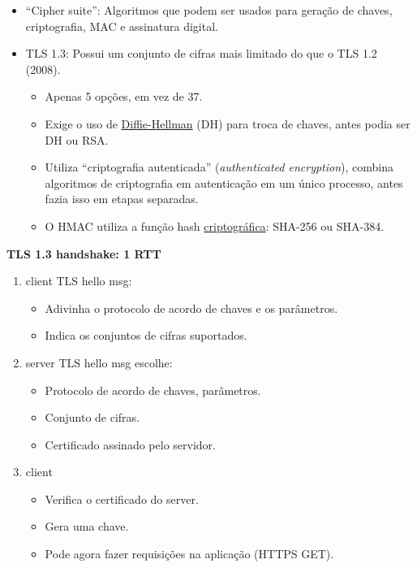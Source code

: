     \begin{itemize}[left=0.5cm, align=left, nosep]
        \item ``Cipher suite'': Algoritmos que podem ser usados para geração de chaves, criptografia, MAC e assinatura digital.
        \item TLS 1.3: Possui um conjunto de cifras mais limitado do que o TLS 1.2 (2008).
        \begin{itemize}[left=0.5cm, nosep, label=$\hookrightarrow$]
            \item Apenas 5 opções, em vez de 37.
            \item Exige o uso de \underline{Diffie-Hellman} (DH) para troca de chaves, antes podia ser DH ou RSA.
            \item Utiliza ``criptografia autenticada'' (\textit{authenticated encryption}), combina algoritmos de criptografia em autenticação em um único processo, antes 
            fazia isso em etapas separadas.
            \item O HMAC utiliza a função hash \underline{criptográfica}: SHA-256 ou SHA-384.
        \end{itemize}     
    \end{itemize}

    \textbf{TLS 1.3 handshake: 1 RTT}

    \begin{enumerate}[left=0.5cm, align=left, nosep]
        \item client TLS hello msg:
        \begin{itemize}[left=0.5cm, align=left, nosep]
            \item Adivinha o protocolo de acordo de chaves e os parâmetros.
            \item Indica os conjuntos de cifras suportados.
        \end{itemize}
        \item server TLS hello msg escolhe:
        \begin{itemize}[left=0.5cm, align=left, nosep]
            \item Protocolo de acordo de chaves, parâmetros.
            \item Conjunto de cifras.
            \item Certificado assinado pelo servidor.
        \end{itemize}
        \item client
        \begin{itemize}[left=0.5cm, align=left, nosep]
            \item Verifica o certificado do server.
            \item Gera uma chave.
            \item Pode agora fazer requisições na aplicação (HTTPS GET).
        \end{itemize}
    \end{enumerate}

